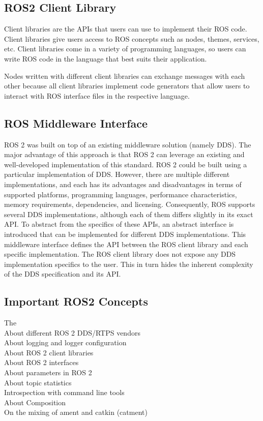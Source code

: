 	\subsection{ROS2 Client Library}
	\label{Grundlagen:ROS2:ROS2ClientLibrary}
	Client libraries are the APIs that users can use to implement their ROS code. Client libraries give users access to ROS concepts such as nodes, themes, services, etc. Client libraries come in a variety of programming languages, so users can write ROS code in the language that best suits their application.

	Nodes written with different client libraries can exchange messages with each other because all client libraries implement code generators that allow users to interact with ROS interface files in the respective language.

	\subsection{ROS Middleware Interface}
	\label{Grundlagen:ROS2:ROSMiddlewareInterface}
	ROS 2 was built on top of an existing middleware solution (namely DDS). The major advantage of this approach is that ROS 2 can leverage an existing and well-developed implementation of this standard. ROS 2 could be built using a particular implementation of DDS. However, there are multiple different implementations, and each has its advantages and disadvantages in terms of supported platforms, programming languages, performance characteristics, memory requirements, dependencies, and licensing. Consequently, ROS supports several DDS implementations, although each of them differs slightly in its exact API. To abstract from the specifics of these APIs, an abstract interface is introduced that can be implemented for different DDS implementations. This middleware interface defines the API between the ROS client library and each specific implementation. The ROS client library does not expose any DDS implementation specifics to the user. This in turn hides the inherent complexity of the DDS specification and its API.\cite{ros2OnMW}
	
	\subsection{Important ROS2 Concepts}
	\label{Grundlagen:ROS2:Concepts}

		
		The \\
		About different ROS 2 DDS/RTPS vendors\\	
		About logging and logger configuration\\
		About ROS 2 client libraries\\
		About ROS 2 interfaces\\
		About parameters in ROS 2\\
		About topic statistics\\
		Introspection with command line tools\\
		About Composition\\
		On the mixing of ament and catkin (catment)\\

